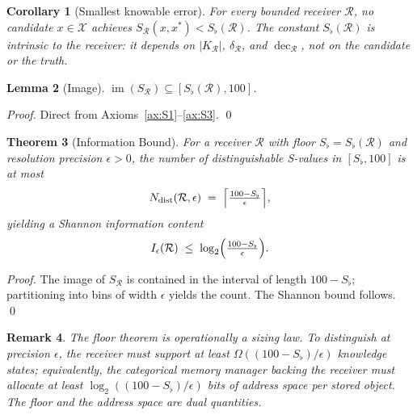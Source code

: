 \documentclass[twocolumn,a4paper]{article}
\newtheorem{theorem}{Theorem}[section]
\newtheorem{lemma}[theorem]{Lemma}
\newtheorem{corollary}[theorem]{Corollary}
\newtheorem{remark}[theorem]{Remark}
\DeclareMathOperator{\img}{im}
\DeclareMathOperator{\dec}{dec}
\newcommand{\Cands}{\mathcal{X}}
\newcommand{\receiver}{\mathcal{R}}
\newcommand{\Sscalar}{S}
\newcommand{\Sfloor}{S_{\flat}}
\begin{document}
\begin{corollary}[Smallest knowable error]
\label{cor:smallest-error}
For every bounded receiver $\receiver$, no candidate $x\in\Cands$ achieves $\Sscalar_{\receiver}(x,x^{*})<\Sfloor(\receiver)$. The constant $\Sfloor(\receiver)$ is intrinsic to the receiver: it depends on $|K_{\receiver}|$, $\delta_{\receiver}$, and $\dec_{\receiver}$, not on the candidate or the truth.
\end{corollary}

\begin{lemma}[Image]
\label{lem:image}
$\img(\Sscalar_{\receiver})\subseteq[\Sfloor(\receiver),100]$.
\end{lemma}

\begin{proof}
Direct from Axioms~\ref{ax:S1}--\ref{ax:S3}. \qed
\end{proof}

\begin{theorem}[Information Bound]
\label{thm:info-bound}
For a receiver $\receiver$ with floor $\Sfloor=\Sfloor(\receiver)$ and resolution precision $\epsilon>0$, the number of distinguishable S-values in $[\Sfloor,100]$ is at most
\[
N_{\text{dist}}(\receiver,\epsilon)\;=\;\Bigl\lceil\tfrac{100-\Sfloor}{\epsilon}\Bigr\rceil,
\]
yielding a Shannon information content
\[
I_{\epsilon}(\receiver)\;\leq\;\log_{2}\Bigl(\tfrac{100-\Sfloor}{\epsilon}\Bigr).
\]
\end{theorem}

\begin{proof}
The image of $\Sscalar_{\receiver}$ is contained in the interval of length $100-\Sfloor$; partitioning into bins of width $\epsilon$ yields the count. The Shannon bound follows. \qed
\end{proof}

\begin{remark}
The floor theorem is operationally a sizing law. To distinguish at precision $\epsilon$, the receiver must support at least $\Omega((100-\Sfloor)/\epsilon)$ knowledge states; equivalently, the categorical memory manager backing the receiver must allocate at least $\log_{2}((100-\Sfloor)/\epsilon)$ bits of address space per stored object. The floor and the address space are dual quantities.
\end{remark}
\end{document}
